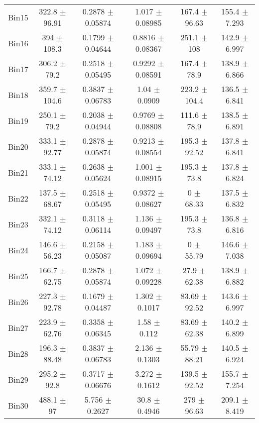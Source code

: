 \begin{tabular}{@{\extracolsep{4pt}}lccccc@{}}
     Bin15 & 322.8 $\pm$ 96.91 & 0.2878 $\pm$ 0.05874 & 1.017 $\pm$ 0.08985 & 167.4 $\pm$ 96.63 & 155.4 $\pm$ 7.293 \\ 
     Bin16 & 394 $\pm$ 108.3 & 0.1799 $\pm$ 0.04644 & 0.8816 $\pm$ 0.08367 & 251.1 $\pm$ 108 & 142.9 $\pm$ 6.997 \\ 
     Bin17 & 306.2 $\pm$ 79.2 & 0.2518 $\pm$ 0.05495 & 0.9292 $\pm$ 0.08591 & 167.4 $\pm$ 78.9 & 138.9 $\pm$ 6.866 \\ 
     Bin18 & 359.7 $\pm$ 104.6 & 0.3837 $\pm$ 0.06783 & 1.04 $\pm$ 0.0909 & 223.2 $\pm$ 104.4 & 136.5 $\pm$ 6.841 \\ 
     Bin19 & 250.1 $\pm$ 79.2 & 0.2038 $\pm$ 0.04944 & 0.9769 $\pm$ 0.08808 & 111.6 $\pm$ 78.9 & 138.5 $\pm$ 6.891 \\ 
     Bin20 & 333.1 $\pm$ 92.77 & 0.2878 $\pm$ 0.05874 & 0.9213 $\pm$ 0.08554 & 195.3 $\pm$ 92.52 & 137.8 $\pm$ 6.841 \\ 
     Bin21 & 333.1 $\pm$ 74.12 & 0.2638 $\pm$ 0.05624 & 1.001 $\pm$ 0.08915 & 195.3 $\pm$ 73.8 & 137.8 $\pm$ 6.824 \\ 
     Bin22 & 137.5 $\pm$ 68.67 & 0.2518 $\pm$ 0.05495 & 0.9372 $\pm$ 0.08627 & 0 $\pm$ 68.33 & 137.5 $\pm$ 6.832 \\ 
     Bin23 & 332.1 $\pm$ 74.12 & 0.3118 $\pm$ 0.06114 & 1.136 $\pm$ 0.09497 & 195.3 $\pm$ 73.8 & 136.8 $\pm$ 6.816 \\ 
     Bin24 & 146.6 $\pm$ 56.23 & 0.2158 $\pm$ 0.05087 & 1.183 $\pm$ 0.09694 & 0 $\pm$ 55.79 & 146.6 $\pm$ 7.038 \\ 
     Bin25 & 166.7 $\pm$ 62.75 & 0.2878 $\pm$ 0.05874 & 1.072 $\pm$ 0.09228 & 27.9 $\pm$ 62.38 & 138.9 $\pm$ 6.882 \\ 
     Bin26 & 227.3 $\pm$ 92.78 & 0.1679 $\pm$ 0.04487 & 1.302 $\pm$ 0.1017 & 83.69 $\pm$ 92.52 & 143.6 $\pm$ 6.997 \\ 
     Bin27 & 223.9 $\pm$ 62.76 & 0.3358 $\pm$ 0.06345 & 1.58 $\pm$ 0.112 & 83.69 $\pm$ 62.38 & 140.2 $\pm$ 6.899 \\ 
     Bin28 & 196.3 $\pm$ 88.48 & 0.3837 $\pm$ 0.06783 & 2.136 $\pm$ 0.1303 & 55.79 $\pm$ 88.21 & 140.5 $\pm$ 6.924 \\ 
     Bin29 & 295.2 $\pm$ 92.8 & 0.3717 $\pm$ 0.06676 & 3.272 $\pm$ 0.1612 & 139.5 $\pm$ 92.52 & 155.7 $\pm$ 7.254 \\ 
     Bin30 & 488.1 $\pm$ 97 & 5.756 $\pm$ 0.2627 & 30.8 $\pm$ 0.4946 & 279 $\pm$ 96.63 & 209.1 $\pm$ 8.419 \\ 
\hline\hline
  \end{tabular}
